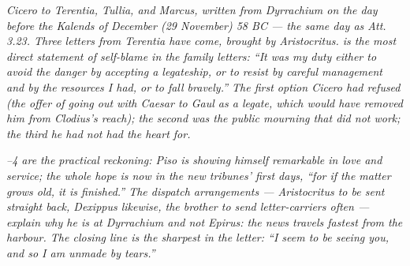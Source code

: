 
\textit{Cicero to Terentia, Tullia, and Marcus, written from
Dyrrachium on the day before the Kalends of December (29
November) 58 BC --- the same day as Att. 3.23. Three letters
from Terentia have come, brought by Aristocritus.
 is the most direct statement of self-blame in
the family letters: ``It was my duty either to avoid the
danger by accepting a legateship, or to resist by careful
management and by the resources I had, or to fall bravely.''
The first option Cicero had refused (the offer of going out
with Caesar to Gaul as a legate, which would have removed him
from Clodius's reach); the second was the public mourning
that did not work; the third he had not had the heart for.}

\textit{--4 are the practical reckoning: Piso
is showing himself remarkable in love and service; the whole
hope is now in the new tribunes' first days, ``for if the
matter grows old, it is finished.'' The dispatch
arrangements --- Aristocritus to be sent straight back,
Dexippus likewise, the brother to send letter-carriers often
--- explain why he is at Dyrrachium and not Epirus: the news
travels fastest from the harbour. The closing line is the
sharpest in the letter: ``I seem to be seeing you, and so I am
unmade by tears.''}
